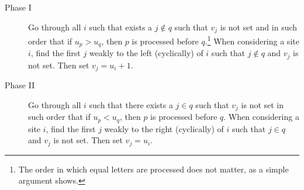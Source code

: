 \documentclass[reqno]{amsart}
\newcommand{\0}{\phantom{c}}
\theoremstyle{plain}
\theoremstyle{definition}
\numberwithin{equation}{section}
\begin{document}
\begin{description}
\item[Phase I]
  Go through all $i$ such that exists a $j \notin q$ such that $v_j$ is not set and in such order that if $u_p > u_q$, then $p$ is processed before $q$.\footnote{The order in which equal letters are processed does not matter, as a simple argument shows.}
  When considering a site $i$, find the first $j$ weakly to the left (cyclically) of $i$ such that $j \notin q$ and $v_j$ is not set.
  Then set $v_j = u_i + 1$.

\item[Phase II]
  Go through all $i$ such that there exists a $j \in q$ such that $v_j$ is not set in such order that if $u_p < u_q$, then $p$ is processed before $q$.
  When considering a site $i$, find the first $j$ weakly to the right (cyclically) of $i$ such that $j \in q$ and $v_j$ is not set.
  Then set $v_j = u_i$.
\end{description}
\end{document}
